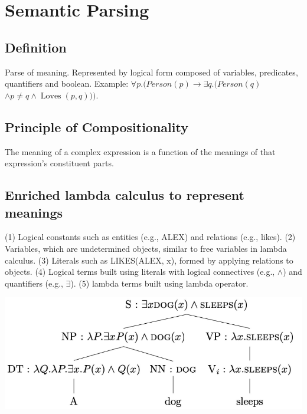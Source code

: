 \section{Semantic Parsing}

\subsection*{Definition}
Parse of meaning. Represented by logical form composed of variables, predicates, quantifiers and boolean. Example: $\forall p .(P e r s o n(p) \rightarrow \exists q .(P e r s o n(q)$
$\wedge p \neq q \wedge \operatorname{Loves}(p, q)))$.

\subsection*{Principle of Compositionality}
The meaning of a complex expression is a function of
the meanings of that expression's constituent parts.

\subsection*{Enriched lambda calculus to represent meanings}

(1) Logical constants such as entities (e.g., ALEX) and relations (e.g., likes). 
(2) Variables, which are undetermined objects, similar to free variables in lambda calculus.
(3) Literals such as LIKES(ALEX, x), formed by applying relations to objects.
(4) Logical terms built using literals with logical connectives (e.g., $\land$) and quantifiers (e.g., $\exists$).
(5) lambda terms built using lambda operator.

\includegraphics[width=.22\textwidth]{img/semantic_representation.png}
